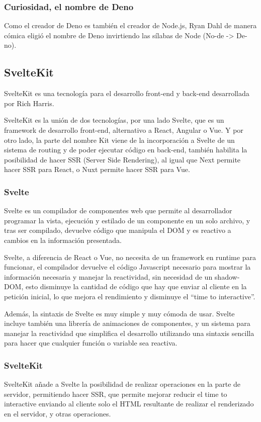 \subsubsection{Curiosidad, el nombre de Deno}
Como el creador de Deno es también el creador de Node.js, Ryan Dahl de manera cómica eligió el nombre de Deno invirtiendo las sílabas de Node (No-de -> De-no).


\subsection{SvelteKit}
SvelteKit es una tecnología para el desarrollo front-end y back-end desarrollada por Rich Harris.

SvelteKit es la unión de dos tecnologías, por una lado Svelte, que es un framework de desarrollo front-end, alternativo a React, Angular o Vue. Y por otro lado, la parte del nombre Kit viene de la incorporación a Svelte de un sistema de routing y de poder ejecutar código en back-end, también habilita la posibilidad de hacer SSR (Server Side Rendering), al igual que Next permite hacer SSR para React, o Nuxt permite hacer SSR para Vue.

\subsubsection{Svelte}
Svelte es un compilador de componentes web que permite al desarrollador programar la vista, ejecución y estilado de un componente en un solo archivo, y tras ser compilado, devuelve código que manipula el DOM y es reactivo a cambios en la información presentada.

Svelte, a diferencia de React o Vue, no necesita de un framework en runtime para funcionar, el compilador devuelve el código Javascript necesario para mostrar la información necesaria y manejar la reactividad, sin necesidad de un shadow-DOM, esto disminuye la cantidad de código que hay que enviar al cliente en la petición inicial, lo que mejora el rendimiento y disminuye el “time to interactive”.

Además, la sintaxis de Svelte es muy simple y muy cómoda de usar. Svelte incluye también una librería de animaciones de componentes, y un sistema para manejar la reactividad que simplifica el desarrollo utilizando una sintaxis sencilla para hacer que cualquier función o variable sea reactiva.

\subsubsection{SvelteKit}
SvelteKit añade a Svelte la posibilidad de realizar operaciones en la parte de servidor, permitiendo hacer SSR, que permite mejorar reducir el time to interactive enviando al cliente solo el HTML resultante de realizar el renderizado en el servidor, y otras operaciones.

